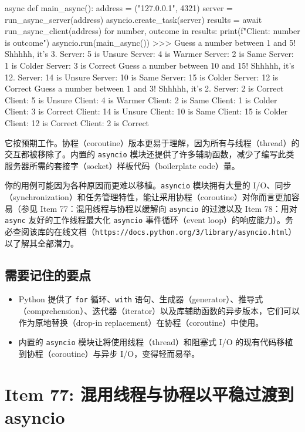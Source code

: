 \begin{codebox}[python]
async def main_async():
    address = ("127.0.0.1", 4321)
    server = run_async_server(address)
    asyncio.create_task(server)
    results = await run_async_client(address)
    for number, outcome in results:
        print(f"Client: {number} is {outcome}")
asyncio.run(main_async())
>>>
Guess a number between 1 and 5! Shhhhh, it's 3.
Server: 5 is Unsure
Server: 4 is Warmer
Server: 2 is Same
Server: 1 is Colder
Server: 3 is Correct
Guess a number between 10 and 15! Shhhhh, it's 12.
Server: 14 is Unsure
Server: 10 is Same
Server: 15 is Colder
Server: 12 is Correct
Guess a number between 1 and 3! Shhhhh, it's 2.
Server: 2 is Correct
Client: 5 is Unsure
Client: 4 is Warmer
Client: 2 is Same
Client: 1 is Colder
Client: 3 is Correct
Client: 14 is Unsure
Client: 10 is Same
Client: 15 is Colder
Client: 12 is Correct
Client: 2 is Correct
\end{codebox}

它按预期工作。协程（coroutine）版本更易于理解，因为所有与线程（thread）的交互都被移除了。内置的 \texttt{asyncio} 模块还提供了许多辅助函数，减少了编写此类服务器所需的套接字（socket）样板代码（boilerplate code）量。

你的用例可能因为各种原因而更难以移植。\texttt{asyncio} 模块拥有大量的 I/O、同步（synchronization）和任务管理特性，能让采用协程（coroutine）对你而言更加容易（参见 Item 77：混用线程与协程以缓解向 \texttt{asyncio} 的过渡以及 Item 78：用对 \texttt{async} 友好的工作线程最大化 \texttt{asyncio} 事件循环（event loop）的响应能力）。务必查阅该库的在线文档（\texttt{https://docs.python.org/3/library/asyncio.html}）以了解其全部潜力。

\subsection{需要记住的要点}

\begin{itemize}
\item Python 提供了 \texttt{for} 循环、\texttt{with} 语句、生成器（generator）、推导式（comprehension）、迭代器（iterator）以及库辅助函数的异步版本，它们可以作为原地替换（drop-in replacement）在协程（coroutine）中使用。
\item 内置的 \texttt{asyncio} 模块让将使用线程（thread）和阻塞式 I/O 的现有代码移植到协程（coroutine）与异步 I/O，变得轻而易举。
\end{itemize}

\section{Item 77: 混用线程与协程以平稳过渡到 asyncio}

